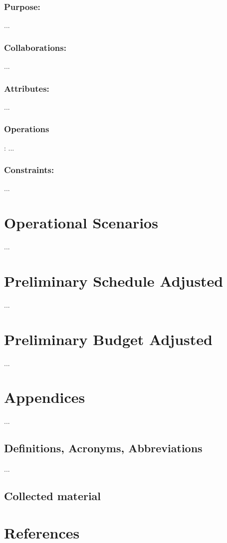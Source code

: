 \documentclass[]{article}
\begin{document}
\subsubsection {Purpose: }
... 
\subsubsection {Collaborations: }
... 
\subsubsection {Attributes: }
... 
\subsubsection {Operations}: 
... 
\subsubsection {Constraints:} 
... 

\section{Operational Scenarios}
... 

\section{Preliminary Schedule Adjusted}
... 
\section{Preliminary Budget Adjusted}
... 
\section{Appendices}
... 
\subsection{Definitions, Acronyms, Abbreviations}
... 
\subsection{Collected material}

\section {References}



\end{document}
